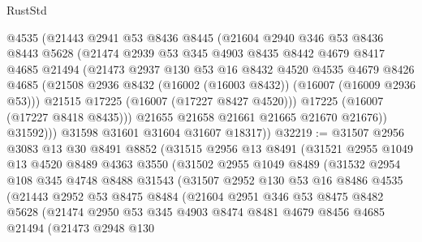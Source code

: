 \begin{lexlean}{RustStd}
\begin{coremodule}
              @4535
              (@21443
                @2941
                @53
                @8436
                @8445
                (@21604
                  @2940
                  @346
                  @53
                  @8436
                  @8443
                  @5628
                  (@21474
                    @2939
                    @53
                    @345
                    @4903
                    @8435
                    @8442
                    @4679
                    @8417
                    @4685
                    @21494
                    (@21473
                      @2937
                      @130
                      @53
                      @16
                      @8432
                      @4520
                      @4535
                      @4679
                      @8426
                      @4685
                      (@21508 @2936 @8432 (@16002 (@16003 @8432)) (@16007 (@16009 @2936 @53)))
                      @21515
                      @17225
                      (@16007 (@17227 @8427 @4520)))
                    @17225
                    (@16007 (@17227 @8418 @8435)))
                  @21655
                  @21658
                  @21661
                  @21665
                  @21670
                  @21676))
              @31592)))
        @31598
        @31601
        @31604
        @31607
        @18317))
@32219 := @31507
    @2956
    @3083
    @13
    @30
    @8491
    @8852
    (@31515
      @2956
      @13
      @8491
      (@31521
        @2955
        @1049
        @13
        @4520
        @8489
        @4363
        @3550
        (@31502
          @2955
          @1049
          @8489
          (@31532
            @2954
            @108
            @345
            @4748
            @8488
            @31543
            (@31507
              @2952
              @130
              @53
              @16
              @8486
              @4535
              (@21443
                @2952
                @53
                @8475
                @8484
                (@21604
                  @2951
                  @346
                  @53
                  @8475
                  @8482
                  @5628
                  (@21474
                    @2950
                    @53
                    @345
                    @4903
                    @8474
                    @8481
                    @4679
                    @8456
                    @4685
                    @21494
                    (@21473
                      @2948
                      @130

\end{coremodule}
\end{lexlean}
